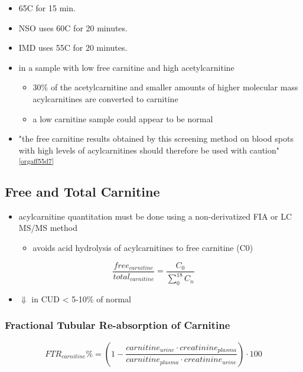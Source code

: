 \documentclass[12pt]{scrartcl}
\begin{document}
\begin{itemize}
\item 65\degree{}C for 15 min.
\item NSO uses 60\degree{}C for 20 minutes.
\item IMD uses 55\degree{}C for 20 minutes.

\item in a sample with low free carnitine and high acetylcarnitine
\begin{itemize}
\item 30\% of the acetylcarnitine and smaller amounts of higher
molecular mass acylcarnitines are converted to carnitine
\item a low carnitine sample could appear to be normal
\end{itemize}
\item "the free carnitine results obtained by this screening method on
blood spots with high levels of acylcarnitines should therefore be
used with caution" \textsuperscript{\ref{orgaff55d7}}
\end{itemize}


\subsection{Free and Total Carnitine}
\label{sec:orgd475efa}
\begin{itemize}
\item acylcarnitine quantitation must be done using a non-derivatized FIA
or LC MS/MS method
\begin{itemize}
\item avoids acid hydrolysis of acylcarnitines to free carnitine (C0)
\end{itemize}
\end{itemize}

\[
\frac{free_{carnitine}}{total_{carnitine}} = \frac{C_0}{\sum_{0}^{18} C_n}
\]

\begin{itemize}
\item \(\Downarrow\) in CUD \textless{} 5-10\% of normal
\end{itemize}


\subsubsection{Fractional Tubular Re-absorption of Carnitine}
\label{sec:org67ab978}

\begin{equation*}
FTR_{carnitine}\% = \left( 1 -  \frac{carnitine_{urine} \cdot creatinine_{plasma}}{carnitine_{plasma} \cdot creatinine_{urine}}\right) \cdot 100
\end{equation*}
\end{document}
